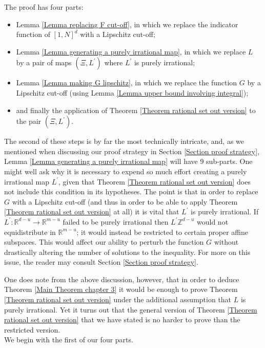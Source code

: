\documentclass[12pt,a4paper,twoside,reqno]{amsart}
\numberwithin{equation}{section}
\begin{document}
The proof has four parts: 
\begin{itemize}
\item Lemma \ref{Lemma replacing F cut-off}, in which we replace the indicator function of $[1,N]^d$ with a Lipschitz cut-off;
\item Lemma \ref{Lemma generating a purely irrational map}, in which we replace $L$ by a pair of maps $(\Xi,L^\prime)$ where $L^\prime$ is purely irrational;
\item Lemma \ref{Lemma making G lipschitz}, in which we replace the function $G$ by a Lipschitz cut-off (using Lemma \ref{Lemma upper bound involving integral});
\item and finally the application of Theorem \ref{Theorem rational set out version} to the pair $(\Xi,L^\prime)$.
\end{itemize} 
\noindent The second of these steps is by far the most technically intricate, and, as we mentioned when discussing our proof strategy in Section \ref{Section proof strategy}, Lemma \ref{Lemma generating a purely irrational map} will have 9 sub-parts. One might well ask why it is necessary to expend so much effort creating a purely irrational map $L^\prime$, given that Theorem \ref{Theorem rational set out version} does not include this condition in its hypotheses. The point is that in order to replace $G$ with a Lipschitz cut-off (and thus in order to be able to apply Theorem \ref{Theorem rational set out version} at all) it is vital that $L^\prime$ is purely irrational. If $L^\prime:\mathbb{R}^{d-u} \longrightarrow \mathbb{R}^{m-u}$ failed to be purely irrational then $L^\prime \mathbb{Z}^{d-u}$ would not equidistribute in $\mathbb{R}^{m-u}$; it would instead be restricted to certain proper affine subspaces. This would affect our ability to perturb the function $G$ without drastically altering the number of solutions to the inequality. For more on this issue, the reader may consult Section \ref{Section proof strategy}.

One does note from the above discussion, however, that in order to deduce Theorem \ref{Main Theorem chapter 3} it would be enough to prove Theorem \ref{Theorem rational set out version} under the additional assumption that $L$ is purely irrational. Yet it turns out that the general version of Theorem \ref{Theorem rational set out version} that we have stated is no harder to prove than the restricted version. \\

We begin with the first of our four parts. 
\end{document}
